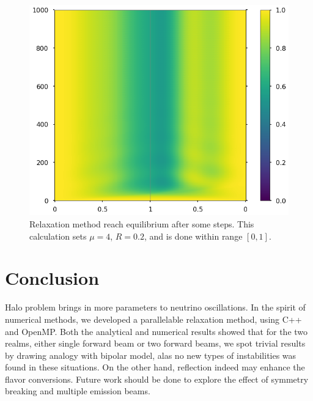 \begin{figure}
    \centering
    \includegraphics[width=\textwidth]{chapters/assets/halo/relax-color.png}
    \caption{Relaxation method reach equilibrium after some steps. This calculation sets $\mu = 4$, $R=0.2$, and is done within range $[0,1]$.}
    \label{chap:halo-sec:num-fig:relax-color}
\end{figure}





\section{Conclusion}

Halo problem brings in more parameters to neutrino oscillations. In the spirit of numerical methods, we developed a parallelable relaxation method, using C++ and OpenMP. Both the analytical and numerical results showed that for the two realms, either single forward beam or two forward beams, we spot trivial results by drawing analogy with bipolar model, alas no new types of instabilities was found in these situations. On the other hand, reflection indeed may enhance the flavor conversions. Future work should be done to explore the effect of symmetry breaking and multiple emission beams.